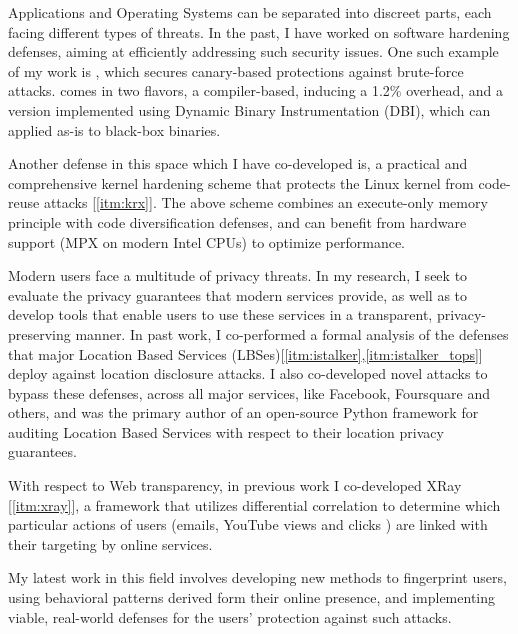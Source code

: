 \begin{cvparagraph}

Applications and Operating Systems can be separated into discreet parts, each
facing different types of threats. In the past, I have worked on software
hardening defenses, aiming at efficiently addressing such security issues. One
such example of my work is \dynaguard [\ref{itm:dynaguard}], which secures
canary-based protections against brute-force attacks. \dynaguard comes in two
flavors, a compiler-based, inducing a 1.2\% overhead, and a version
implemented using Dynamic Binary Instrumentation (DBI), which can applied
as-is to black-box binaries.

Another defense in this space which I have co-developed is, \krx a practical
and comprehensive kernel hardening scheme that protects the Linux kernel
from code-reuse attacks [\ref{itm:krx}]. The above scheme combines an
execute-only memory principle with code diversification defenses, and can
benefit from hardware support (\eg MPX on modern Intel CPUs) to optimize
performance.

\end{cvparagraph}


\begin{cvparagraph}

Modern users face a multitude of privacy threats. In my research, I seek to
evaluate the privacy guarantees that modern services provide, as well as to
develop tools that enable users to use these services in a transparent,
privacy-preserving manner. In
past work, I co-performed a formal analysis of the defenses that major
Location Based Services (LBSes)[\ref{itm:istalker},\ref{itm:istalker_tops}]
deploy against location disclosure attacks. I also co-developed novel attacks
to bypass these defenses, across all major services, like Facebook, Foursquare
and others, and was the primary author of an open-source Python
framework for auditing Location Based Services with respect to their
location privacy guarantees.

With respect to Web transparency, in previous work I co-developed XRay
[\ref{itm:xray}], a framework that utilizes differential correlation to
determine which particular actions of users (emails, YouTube views and
clicks \etc) are linked with their targeting by online services.

My latest work in this field involves developing new methods to fingerprint
users, using behavioral patterns derived form their online presence, and
implementing viable, real-world defenses for the users' protection against
such attacks.

\end{cvparagraph}

